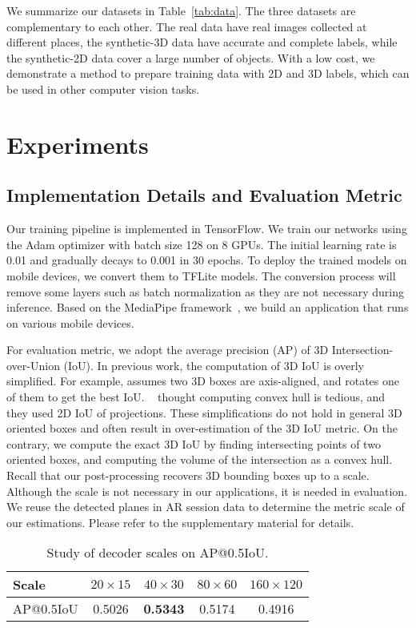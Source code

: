 \documentclass[runningheads]{llncs}
\begin{document}
We summarize our datasets in Table~\ref{tab:data}. The three datasets are complementary to each other. The real data have real images collected at different places, the synthetic-3D data have accurate and complete labels, while the synthetic-2D data cover a large number of objects. With a low cost, we demonstrate a method to prepare training data with 2D and 3D labels, which can be used in other computer vision tasks.


\section{Experiments}

\subsection{Implementation Details and Evaluation Metric}
Our training pipeline is implemented in TensorFlow. We train our networks using the Adam optimizer with batch size 128 on 8 GPUs. The initial learning rate is 0.01 and gradually decays to 0.001 in 30 epochs. To deploy the trained models on mobile devices, we convert them to TFLite models. The conversion process will remove some layers such as batch normalization as they are not necessary during inference. Based on the MediaPipe framework~\cite{MediaPipe}, we build an application that runs on various mobile devices.

For evaluation metric, we adopt the average precision (AP) of 3D Intersection-over-Union (IoU). In previous work, the computation of 3D IoU is overly simplified. For example, \cite{Wang_2019_NOCS} assumes two 3D boxes are axis-aligned, and rotates one of them to get the best IoU. ~\cite{Tekin_2018_SingleShot} thought computing convex hull is tedious, and they used 2D IoU of projections. These simplifications do not hold in general 3D oriented boxes and often result in over-estimation of the 3D IoU metric. On the contrary, we compute the exact 3D IoU by finding intersecting points of two oriented boxes, and computing the volume of the intersection as a convex hull. Recall that our post-processing recovers 3D bounding boxes up to a scale. Although the scale is not necessary in our applications, it is needed in evaluation. We reuse the detected planes in AR session data to determine the metric scale of our estimations. Please refer to the supplementary material for details.


\begin{table}[t]
\begin{center}
\begin{tabular}{l@{\hskip 0.2cm}|@{\hskip 0.2cm}c@{\hskip 0.2cm}|@{\hskip 0.2cm}c@{\hskip 0.2cm}|@{\hskip 0.2cm}c@{\hskip 0.2cm}|c}
\hline
Scale & $20\times15$ & $40\times30$ & $80\times60$ & $160\times120$ \\
\hline
AP@0.5IoU & 0.5026 & \textbf{0.5343} & 0.5174 & 0.4916\\
\hline
\end{tabular}
\caption{Study of decoder scales on AP@0.5IoU.}
\label{tab:scale}
\end{center}
\end{table}
\end{document}
